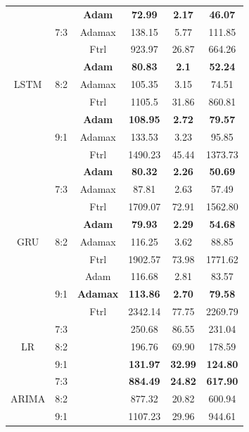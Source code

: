 \documentclass{ieeeojies}
\begin{document}
\begin{table}[H]
\begin{tabular}{|c|c|c|c|c|c|}
        \multirow{9}{*}{LSTM} & \multirow{3}{*}{7:3} & \textbf{Adam} & \textbf{72.99} & \textbf{2.17} & \textbf{46.07} \\ \cline{3-6}
         &  & Adamax & 138.15 & 5.77 & 111.85 \\ \cline{3-6}
         &  & Ftrl & 923.97 & 26.87 & 664.26 \\ \cline{2-6}
         & \multirow{3}{*}{8:2} & \textbf{Adam} & \textbf{80.83} & \textbf{2.1} & \textbf{52.24} \\ \cline{3-6}
         &  & Adamax & 105.35 & 3.15 & 74.51 \\ \cline{3-6}
         &  & Ftrl & 1105.5 & 31.86 & 860.81 \\ \cline{2-6}
         & \multirow{3}{*}{9:1} & \textbf{Adam} & \textbf{108.95} & \textbf{2.72} & \textbf{79.57}
         \\ \cline{3-6}
         &  & Adamax & 133.53 & 3.23 & 95.85 \\ \cline{3-6}
         &  & Ftrl & 1490.23 & 45.44 & 1373.73 \\ \hline

         \multirow{9}{*}{GRU} & \multirow{3}{*}{7:3} & \textbf{Adam} & \textbf{80.32} & \textbf{2.26} & \textbf{50.69} \\ \cline{3-6}
            & & Adamax & 87.81 & 2.63 & 57.49 \\ \cline{3-6}
            & & Ftrl & 1709.07 & 72.91 & 1562.80 \\ \cline{2-6}
            & \multirow{3}{*}{8:2} & \textbf{Adam} & \textbf{79.93} & \textbf{2.29} & \textbf{54.68} \\ \cline{3-6}
            & & Adamax & 116.25 & 3.62 & 88.85 \\ \cline{3-6}
            & & Ftrl & 1902.57 & 73.98 & 1771.62 \\ \cline{2-6}
            & \multirow{3}{*}{9:1} & Adam & 116.68 & 2.81 & 83.57 \\ \cline{3-6}
            & & \textbf{Adamax} & \textbf{113.86} & \textbf{2.70} & \textbf{79.58} \\ \cline{3-6}
            & & Ftrl & 2342.14 & 77.75 & 2269.79 \\ \hline
            
         
       \multirow{3}{*}{LR} & 7:3 &  & 250.68 & 86.55 & 231.04 \\ \cline{2-6}
         & 8:2 &  & 196.76 & 69.90 & 178.59 \\ \cline{2-6}
         & 9:1 &  & \textbf{131.97} & \textbf{32.99} & \textbf{124.80}
\\ \hline


        \multirow{3}{*}{ARIMA} & 7:3 &  & \textbf{884.49} & \textbf{24.82} & \textbf{617.90} \\ \cline{2-6}
         & 8:2 &  & 877.32 & 20.82 & 600.94 \\ \cline{2-6}
         & 9:1 &  & 1107.23 & 29.96 & 944.61 \\ \hline

         
    \end{tabular}
\end{table}
\end{document}
